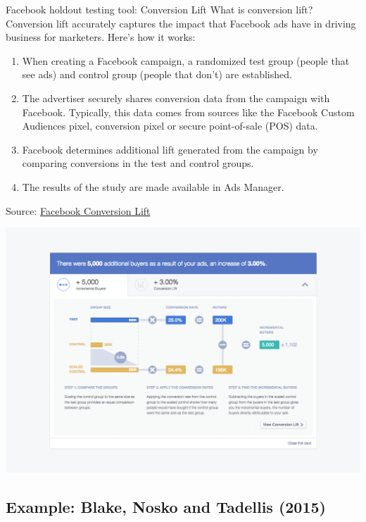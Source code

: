 \documentclass[10pt, aspectratio=169]{beamer}
\newcommand{\source}[1]{\begin{flushright} \footnotesize Source: {#1} \end{flushright} \normalsize}
\begin{document}
\begin{frame}{Facebook holdout testing tool: Conversion Lift}
\alert{What is conversion lift?}\\
Conversion lift accurately captures the impact that Facebook ads have in driving business for marketers. Here's how it works:
\begin{enumerate}
\item When creating a Facebook campaign, a randomized test group (people that see ads) and control group (people that don't) are established.
\item The advertiser securely shares conversion data from the campaign with Facebook. Typically, this data comes from sources like the Facebook Custom Audiences pixel, conversion pixel or secure point-of-sale (POS) data.
\item Facebook determines additional lift generated from the campaign by comparing conversions in the test and control groups.
\item The results of the study are made available in Ads Manager.
\end{enumerate}
\source{\href{https://www.facebook.com/business/news/conversion-lift-measurement}{Facebook Conversion Lift}}
\end{frame}

\begin{frame}{}
\centering
\includegraphics[height=1.2\textheight]{images/FacebookCampaignLift2.png}
\end{frame}

\subsection{Example: Blake, Nosko and Tadellis (2015)}
\end{document}

